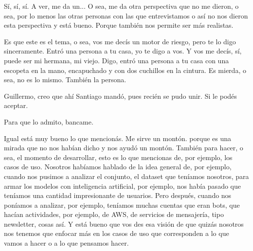 \begin{description}[leftmargin=0cm, labelsep=0.5cm]
    \item[\textbf{MUNTAABSKI FEDERICO:}] Sí, sí, sí. A ver, me da un... O sea, me da otra perspectiva que no me dieron, o sea, por lo menos las otras personas con las que entrevistamos o así no nos dieron esta perspectiva y está bueno. Porque también nos permite ser más realistas.

    \item[\textbf{PITA GUILLERMO:}] Es que este es el tema, o sea, vos me decís un motor de riesgo, pero te lo digo sinceramente. Entró una persona a tu casa, yo te digo a vos. Y vos me decís, sí, puede ser mi hermana, mi viejo. Digo, entró una persona a tu casa con una escopeta en la mano, encapuchado y con dos cuchillos en la cintura. Es mierda, o sea, no es lo mismo. También la persona.

    \item[\textbf{MUNTAABSKI FEDERICO:}] Guillermo, creo que ahí Santiago mandó, pues recién se pudo unir. Si le podés aceptar.

    \item[\textbf{PITA GUILLERMO:}] Para que lo admito, bancame.

    \item[\textbf{MUNTAABSKI FEDERICO:}] Igual está muy bueno lo que mencionás. Me sirve un montón. porque es una mirada que no nos habían dicho y nos ayudó un montón. También para hacer, o sea, el momento de desarrollar, esto es lo que mencionas de, por ejemplo, los casos de uso. Nosotros habíamos hablado de la idea general de, por ejemplo, cuando nos pusimos a analizar el conjunto, el dataset que teníamos nosotros, para armar los modelos con inteligencia artificial, por ejemplo, nos había pasado que teníamos una cantidad impresionante de usuarios. Pero después, cuando nos poníamos a analizar, por ejemplo, teníamos muchas cuentas que eran bots, que hacían actividades, por ejemplo, de AWS, de servicios de mensajería, tipo newsletter, cosas así. Y está bueno que vos des esa visión de que quizás nosotros nos tenemos que enfocar más en los casos de uso que corresponden a lo que vamos a hacer o a lo que pensamos hacer.


\end{description}
